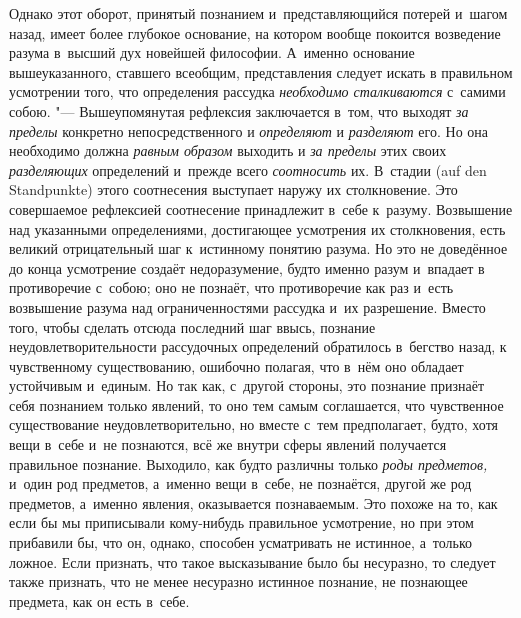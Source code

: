Однако этот оборот, принятый познанием и~представляющийся потерей и~шагом
назад, имеет более глубокое основание, на котором вообще покоится
возведение разума в~высший дух новейшей философии. А~именно основание
вышеуказанного, ставшего всеобщим, представления следует искать в
правильном усмотрении того, что определения рассудка
{\em необходимо сталкиваются} с~самими собою. "---
Вышеупомянутая рефлексия заключается в~том, что выходят
{\em за пределы} конкретно непосредственного и
{\em определяют} и {\em разделяют}
его. Но она необходимо должна {\em равным образом}
выходить и {\em за пределы} этих своих
{\em разделяющих} определений и~прежде всего
{\em соотносить} их. В~стадии (auf den Standpunkte)
этого соотнесения выступает наружу их столкновение. Это совершаемое
рефлексией соотнесение принадлежит в~себе к~разуму. Возвышение над
указанными определениями, достигающее усмотрения их столкновения, есть
великий отрицательный шаг к~истинному понятию разума. Но это не доведённое
до конца усмотрение создаёт недоразумение, будто именно разум и~впадает в
противоречие с~собою; оно не познаёт, что противоречие как раз и~есть
возвышение разума над ограниченностями рассудка и~их разрешение. Вместо
того, чтобы сделать отсюда последний шаг ввысь, познание
неудовлетворительности рассудочных определений обратилось в~бегство назад,
к чувственному существованию, ошибочно полагая, что в~нём оно обладает
устойчивым и~единым. Но так как, с~другой стороны, это познание признаёт
себя познанием только явлений, то оно тем самым соглашается, что
чувственное существование неудовлетворительно, но вместе с~тем
предполагает, будто, хотя вещи в~себе и~не познаются, всё же внутри сферы
явлений получается правильное познание. Выходило, как будто различны только
{\em роды предметов,} и~один род предметов, а~именно
вещи в~себе, не познаётся, другой же род предметов, а~именно явления,
оказывается познаваемым. Это похоже на то, как если бы мы приписывали
кому-нибудь правильное усмотрение, но при этом прибавили бы, что он,
однако, способен усматривать не истинное, а~только ложное. Если признать,
что такое высказывание было бы несуразно, то следует также признать, что не
менее несуразно истинное познание, не познающее предмета, как он есть в~себе.

